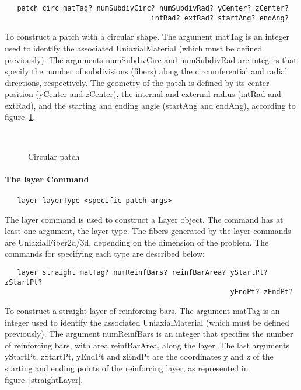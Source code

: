 \documentclass[12pt]{article}
\begin{document}
{\sf\small
\begin{verbatim}
   patch circ matTag? numSubdivCirc? numSubdivRad? yCenter? zCenter? 
                                   intRad? extRad? startAng? endAng?
\end{verbatim}
}

\noindent To construct a patch with a circular shape. The
argument matTag is an integer used to identify the associated
UniaxialMaterial (which must be defined previously). 
The arguments numSubdivCirc and numSubdivRad are integers
that specify the number of subdivisions (fibers) along the
circumferential and radial directions, respectively. 
The geometry of the patch is defined by its center position
(yCenter and zCenter), the internal and external radius 
(intRad and extRad), and the starting and ending angle (startAng 
and endAng), according to figure~\ref{circPatch}. 



\begin{figure}[htpb]
\begin{center}
\leavevmode
\hbox{%
}
\end{center}
\caption{Circular patch}
\label{circPatch}
\end{figure}

\paragraph{The layer Command}

{\sf\small
\begin{verbatim}
   layer layerType <specific patch args>
\end{verbatim}
}

The layer command is used to construct a Layer object. 
The command has at least one argument, the layer type. The fibers
generated by the layer commands are UniaxialFiber2d/3d, depending on
the dimension of the problem. The commands
for specifying each type are described below:

{\sf\small
\begin{verbatim}
   layer straight matTag? numReinfBars? reinfBarArea? yStartPt? zStartPt? 
                                                      yEndPt? zEndPt?
\end{verbatim}
}

\noindent To construct a straight layer of reinforcing bars. The
argument matTag is an integer used to identify the associated
UniaxialMaterial (which must be defined previously). The argument 
numReinfBars is an integer that specifies the number of reinforcing 
bars, with area reinfBarArea, along the layer. The last arguments 
yStartPt, zStartPt, yEndPt and zEndPt are the coordinates y and z of 
the starting and ending points of the
reinforcing layer, as represented in figure~\ref{straightLayer}.
\end{document}

